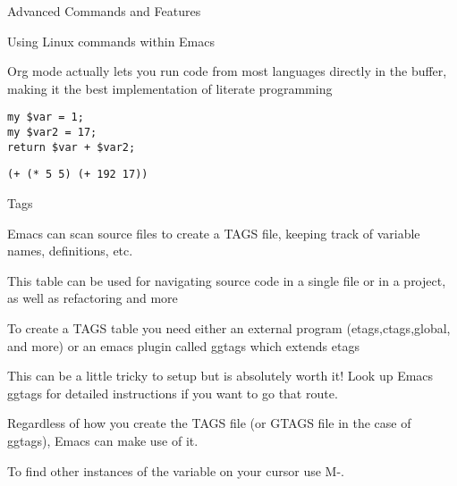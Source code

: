 \documentclass[presentation]{beamer}
\begin{document}
\begin{frame}[fragile,label=sec-4]{Advanced Commands and Features}
\begin{block}{Using Linux commands within Emacs}
\begin{block}{Org mode actually lets you run code from most languages directly in the buffer, making it the best implementation of literate programming}
\begin{verbatim}
my $var = 1;
my $var2 = 17;
return $var + $var2;
\end{verbatim}

\begin{verbatim}
(+ (* 5 5) (+ 192 17))
\end{verbatim}
\end{block}
\end{block}

\begin{block}{Tags}
\begin{block}{Emacs can scan source files to create a TAGS file, keeping track of variable names, definitions, etc.}
\end{block}
\begin{block}{This table can be used for navigating source code in a single file or in a project, as well as refactoring and more}
\end{block}
\begin{block}{To create a TAGS table you need either an external program (etags,ctags,global, and more) or an emacs plugin called ggtags which extends etags}
\begin{block}{This can be a little tricky to setup but is absolutely worth it! Look up Emacs ggtags for detailed instructions if you want to go that route.}
\end{block}
\begin{block}{Regardless of how you create the TAGS file (or GTAGS file in the case of ggtags), Emacs can make use of it.}
\end{block}
\end{block}
\begin{block}{To find other instances of the variable on your cursor use M-.}
\end{block}
\end{block}
\end{frame}
\end{document}
